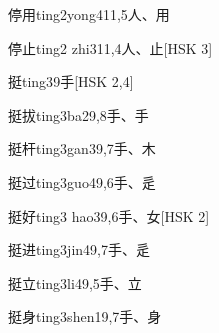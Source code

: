 \begin{EntryWithPhonetic}{停用}{ting2yong4}{11,5}{⼈、⽤}
\end{EntryWithPhonetic}

\begin{EntryWithPhonetic}{停止}{ting2 zhi3}{11,4}{⼈、⽌}[HSK 3]
\end{EntryWithPhonetic}

\begin{EntryWithPhonetic}{挺}{ting3}{9}{⼿}[HSK 2,4]
\end{EntryWithPhonetic}

\begin{EntryWithPhonetic}{挺拔}{ting3ba2}{9,8}{⼿、⼿}
\end{EntryWithPhonetic}

\begin{EntryWithPhonetic}{挺杆}{ting3gan3}{9,7}{⼿、⽊}
\end{EntryWithPhonetic}

\begin{EntryWithPhonetic}{挺过}{ting3guo4}{9,6}{⼿、⾡}
\end{EntryWithPhonetic}

\begin{EntryWithPhonetic}{挺好}{ting3 hao3}{9,6}{⼿、⼥}[HSK 2]
\end{EntryWithPhonetic}

\begin{EntryWithPhonetic}{挺进}{ting3jin4}{9,7}{⼿、⾡}
\end{EntryWithPhonetic}

\begin{EntryWithPhonetic}{挺立}{ting3li4}{9,5}{⼿、⽴}
\end{EntryWithPhonetic}

\begin{EntryWithPhonetic}{挺身}{ting3shen1}{9,7}{⼿、⾝}
\end{EntryWithPhonetic}

